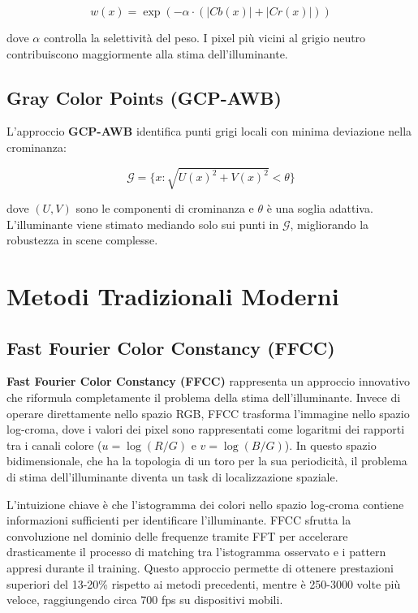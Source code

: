 \begin{equation}
w(x) = \exp\left(-\alpha \cdot (|Cb(x)| + |Cr(x)|)\right)
\end{equation}

dove $\alpha$ controlla la selettività del peso. I pixel più vicini al grigio neutro contribuiscono maggiormente alla stima dell'illuminante.

\subsection{Gray Color Points (GCP-AWB)}

L'approccio \textbf{GCP-AWB} \cite{huo_robust_2006} identifica punti grigi locali con minima deviazione nella crominanza:

\begin{equation}
\mathcal{G} = \{x : \sqrt{U(x)^2 + V(x)^2} < \theta\}
\end{equation}

dove $(U, V)$ sono le componenti di crominanza e $\theta$ è una soglia adattiva. L'illuminante viene stimato mediando solo sui punti in $\mathcal{G}$, migliorando la robustezza in scene complesse.

\section{Metodi Tradizionali Moderni}

\subsection{Fast Fourier Color Constancy (FFCC)}

\textbf{Fast Fourier Color Constancy (FFCC)} \cite{barron_fast_2017} rappresenta un approccio innovativo che riformula completamente il problema della stima dell'illuminante. Invece di operare direttamente nello spazio RGB, FFCC trasforma l'immagine nello spazio log-croma, dove i valori dei pixel sono rappresentati come logaritmi dei rapporti tra i canali colore ($u = \log(R/G)$ e $v = \log(B/G)$). In questo spazio bidimensionale, che ha la topologia di un toro per la sua periodicità, il problema di stima dell'illuminante diventa un task di localizzazione spaziale.

L'intuizione chiave è che l'istogramma dei colori nello spazio log-croma contiene informazioni sufficienti per identificare l'illuminante. FFCC sfrutta la convoluzione nel dominio delle frequenze tramite FFT per accelerare drasticamente il processo di matching tra l'istogramma osservato e i pattern appresi durante il training. Questo approccio permette di ottenere prestazioni superiori del 13-20\% rispetto ai metodi precedenti, mentre è 250-3000 volte più veloce, raggiungendo circa 700 fps su dispositivi mobili.

